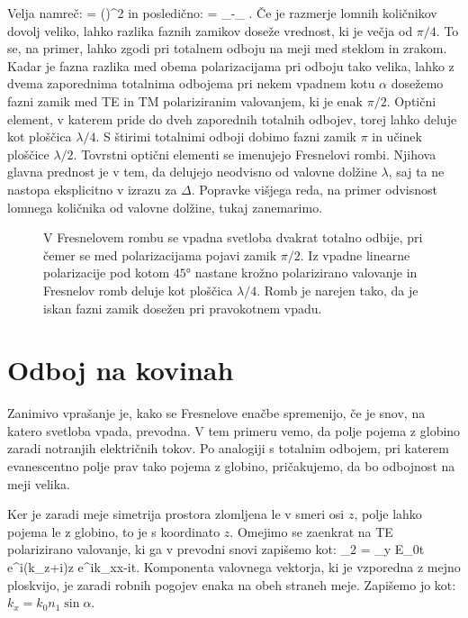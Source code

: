 Velja namreč:
\beq
\tan {} = \left(\right)^2 \tan {}
\label{eq:04_87}
\eeq
in posledično:
\beq
\Delta = \delta_-\delta_ .
\label{eq:04_88}
\eeq
Če je razmerje lomnih količnikov dovolj veliko, lahko razlika faznih zamikov doseže vrednost, ki je
večja od $\pi/4$. To se, na primer, lahko zgodi pri totalnem odboju na meji med steklom in zrakom. 
Kadar je fazna razlika med obema polarizacijama pri odboju tako velika, lahko  z dvema zaporednima
totalnima odbojema pri nekem vpadnem kotu $\alpha$
dosežemo fazni zamik med TE in TM polariziranim valovanjem, ki je enak $\pi/2$. 
Optični element, v katerem pride do dveh zaporednih totalnih odbojev, torej lahko deluje kot ploščica
$\lambda/4$. S štirimi totalnimi odboji dobimo fazni zamik $\pi$ in učinek ploščice $\lambda/2$. Tovrstni optični elementi se imenujejo Fresnelovi rombi. 
Njihova glavna prednost je v tem, da delujejo neodvisno od 
valovne dolžine $\lambda$, saj ta ne nastopa eksplicitno v izrazu za $\Delta$. Popravke 
višjega reda, na primer odvisnost lomnega količnika od valovne dolžine, tukaj zanemarimo.
\begin{figure}[ht]
\centering
\def\svgwidth{70truemm} 

\caption{V Fresnelovem rombu se vpadna svetloba dvakrat totalno odbije, pri čemer
se med polarizacijama pojavi zamik $\pi/2$. Iz vpadne linearne polarizacije pod kotom 
$45\si{\degree}$ nastane krožno polarizirano valovanje in Fresnelov romb deluje 
kot ploščica $\lambda/4$. Romb je narejen tako, da je iskan fazni 
zamik dosežen pri pravokotnem vpadu.}
\label{fig:04_Fresneltot}
\end{figure}

\section{Odboj na kovinah}
\label{section:410}
Zanimivo vprašanje je, kako se Fresnelove enačbe spremenijo, če je snov, 
na katero svetloba vpada, prevodna. V tem primeru
vemo, da polje pojema z globino zaradi notranjih električnih tokov. 
Po analogiji s totalnim odbojem, pri katerem evanescentno polje prav tako
pojema z globino, pričakujemo, da bo odbojnost na meji velika. 

Ker je zaradi meje simetrija prostora zlomljena le v smeri osi $z$, polje
lahko pojema le z globino, to je s koordinato $z$. 
Omejimo se zaenkrat na TE polarizirano valovanje, ki 
ga v prevodni snovi zapišemo kot:
\beq
{}_2 = _y E_{0t} e^{i(k_z+i\varkappa)z} e^{ik_xx-i\omega t}.
\label{eq:04_89}
\eeq
Komponenta valovnega vektorja, ki je vzporedna z mejno ploskvijo, je zaradi
robnih pogojev enaka na obeh straneh meje. Zapišemo jo kot: $k_x = k_0 n_1 \sin \alpha$. 

